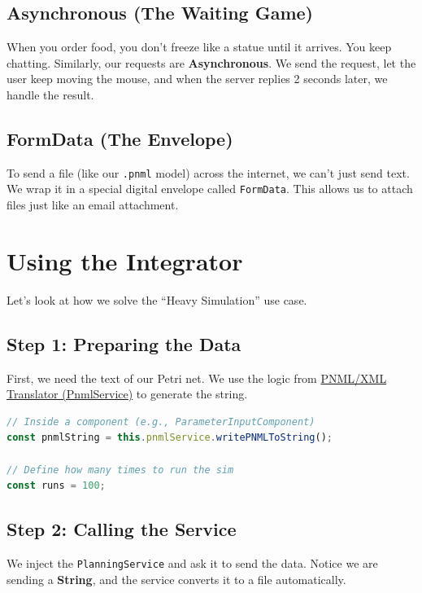 \documentclass[a4paper,11pt,oneside]{report}
\begin{document}
\subsection{Asynchronous (The Waiting Game)}

When you order food, you don't freeze like a statue until it arrives. You keep chatting.
Similarly, our requests are \textbf{Asynchronous}. We send the request, let the user keep moving the mouse, and when the server replies 2 seconds later, we handle the result.

\subsection{FormData (The Envelope)}

To send a file (like our \texttt{.pnml} model) across the internet, we can't just send text. We wrap it in a special digital envelope called \texttt{FormData}. This allows us to attach files just like an email attachment.

\section{Using the Integrator}

Let's look at how we solve the ``Heavy Simulation'' use case.

\subsection{Step 1: Preparing the Data}

First, we need the text of our Petri net. We use the logic from \hyperref[chap:pnmlservice]{PNML/XML Translator (PnmlService)} to generate the string.

\begin{lstlisting}[language=TypeScript]
// Inside a component (e.g., ParameterInputComponent)
const pnmlString = this.pnmlService.writePNMLToString();

// Define how many times to run the sim
const runs = 100;
\end{lstlisting}

\subsection{Step 2: Calling the Service}

We inject the \texttt{PlanningService} and ask it to send the data. Notice we are sending a \textbf{String}, and the service converts it to a file automatically.
\end{document}
